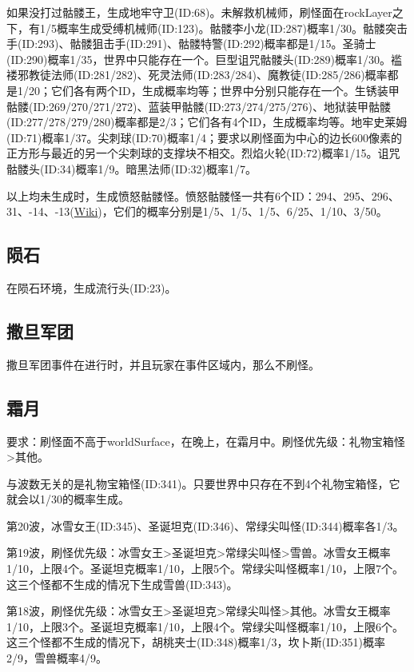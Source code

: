 如果没打过骷髅王，生成地牢守卫(ID:68)。未解救机械师，刷怪面在rockLayer之下，有1/5概率生成受缚机械师(ID:123)。骷髅李小龙(ID:287)概率1/30。骷髅突击手(ID:293)、骷髅狙击手(ID:291)、骷髅特警(ID:292)概率都是1/15。圣骑士(ID:290)概率1/35，世界中只能存在一个。巨型诅咒骷髅头(ID:289)概率1/30。褴褛邪教徒法师(ID:281/282)、死灵法师(ID:283/284)、魔教徒(ID:285/286)概率都是1/20；它们各有两个ID，生成概率均等；世界中分别只能存在一个。生锈装甲骷髅(ID:269/270/271/272)、蓝装甲骷髅(ID:273/274/275/276)、地狱装甲骷髅(ID:277/278/279/280)概率都是2/3；它们各有4个ID，生成概率均等。地牢史莱姆(ID:71)概率1/37。尖刺球(ID:70)概率1/4；要求以刷怪面为中心的边长600像素的正方形与最近的另一个尖刺球的支撑块不相交。烈焰火轮(ID:72)概率1/15。诅咒骷髅头(ID:34)概率1/9。暗黑法师(ID:32)概率1/7。

以上均未生成时，生成愤怒骷髅怪。愤怒骷髅怪一共有6个ID：294、295、296、31、-14、-13(\href{https://terraria-zh.gamepedia.com/愤怒骷髅怪}{Wiki})，它们的概率分别是1/5、1/5、1/5、6/25、1/10、3/50。

\subsection{陨石}
在陨石环境，生成流行头(ID:23)。

\subsection{撒旦军团}
撒旦军团事件在进行时，并且玩家在事件区域内，那么不刷怪。

\subsection{霜月}
要求：刷怪面不高于worldSurface，在晚上，在霜月中。刷怪优先级：礼物宝箱怪>其他。

与波数无关的是礼物宝箱怪(ID:341)。只要世界中只存在不到4个礼物宝箱怪，它就会以1/30的概率生成。

第20波，冰雪女王(ID:345)、圣诞坦克(ID:346)、常绿尖叫怪(ID:344)概率各1/3。

第19波，刷怪优先级：冰雪女王>圣诞坦克>常绿尖叫怪>雪兽。冰雪女王概率1/10，上限4个。圣诞坦克概率1/10，上限5个。常绿尖叫怪概率1/10，上限7个。这三个怪都不生成的情况下生成雪兽(ID:343)。

第18波，刷怪优先级：冰雪女王>圣诞坦克>常绿尖叫怪>其他。冰雪女王概率1/10，上限3个。圣诞坦克概率1/10，上限4个。常绿尖叫怪概率1/10，上限6个。这三个怪都不生成的情况下，胡桃夹士(ID:348)概率1/3，坎卜斯(ID:351)概率2/9，雪兽概率4/9。

